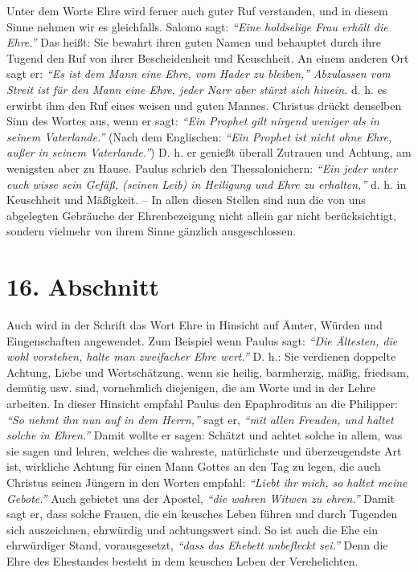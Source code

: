 Unter dem Worte Ehre wird ferner auch guter Ruf verstanden, und in diesem Sinne
nehmen wir es gleichfalls. Salomo sagt:
\textit{"`Eine holdselige Frau erhält die Ehre."'}
Das heißt: Sie bewahrt ihren guten Namen und
behauptet durch ihre Tugend den Ruf von ihrer Bescheidenheit und Keuschheit. An
einem anderen Ort sagt er:
\textit{"`Es ist dem Mann eine Ehre, vom Hader zu
bleiben,"'} \textit{Abzulassen vom Streit ist für den
Mann eine Ehre, jeder Narr aber stürzt sich hinein.}
d. h. es erwirbt ihm den Ruf eines weisen und
guten Mannes. Christus drückt denselben Sinn des Wortes aus, wenn er sagt:
\textit{"`Ein Prophet gilt nirgend weniger als in seinem
Vaterlande."'}
(Nach dem Englischen: \textit{"`Ein Prophet ist nicht ohne Ehre, außer in seinem
Vaterlande."'}) D. h. er genießt überall Zutrauen und Achtung, am wenigsten aber
zu
Hause. Paulus schrieb den Thessalonichern:
\textit{"`Ein jeder unter euch wisse sein
Gefäß, (seinen Leib) in Heiligung und Ehre zu erhalten,"'}
d. h. in Keuschheit und Mäßigkeit. -- In allen diesen Stellen sind nun die
von uns abgelegten Gebräuche der Ehrenbezeigung nicht allein gar nicht
berücksichtigt, sondern vielmehr von ihrem Sinne gänzlich ausgeschlossen.

\section{16. Abschnitt} \label{kap9_ab16}

Auch wird in der Schrift das Wort Ehre in Hinsicht auf Ämter, Würden und
Eingenschaften angewendet. Zum Beispiel wenn Paulus sagt:
\textit{"`Die Ältesten, die wohl
vorstehen, halte man zweifacher Ehre wert."'}
D. h.: Sie
verdienen doppelte Achtung, Liebe und Wertschätzung, wenn sie heilig,
barmherzig, mäßig, friedsam, demütig usw. sind, vornehmlich diejenigen, die
am Worte und in der Lehre arbeiten. In dieser
Hinsicht empfahl Paulus den
Epaphroditus an die Philipper:
\textit{"`So nehmt ihn nun auf in dem Herrn,"'} sagt er,
\textit{"`mit allen Freuden, und haltet solche in Ehren."'}
Damit
wollte er sagen: Schätzt und achtet solche in allem, was sie sagen und lehren,
welches die wahreste, natürlichste und überzeugendste Art ist, wirkliche Achtung
für einen Mann Gottes an den Tag zu legen, die auch Christus seinen Jüngern in
den Worten empfahl:
\textit{"`Liebt ihr mich, so haltet meine Gebote."'}
Auch gebietet uns der Apostel,
\textit{"`die wahren Witwen zu ehren."'} Damit
sagt er, dass solche Frauen, die ein keusches Leben führen und durch Tugenden
sich auszeichnen, ehrwürdig und achtungswert sind. So ist auch die Ehe ein
ehrwürdiger Stand, vorausgesetzt,
\textit{"`dass das Ehebett unbefleckt sei."'}
Denn die Ehre des Ehestandes besteht in dem keuschen
Leben der Verehelichten.

